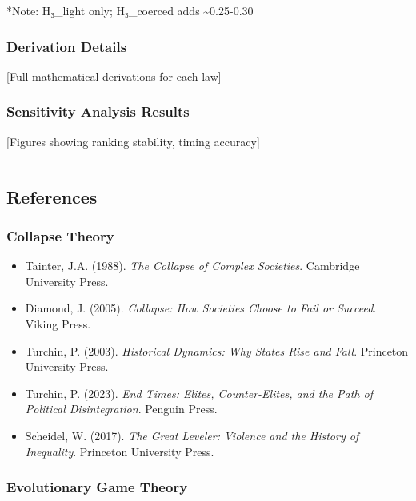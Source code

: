 \documentclass[11pt,letterpaper]{article}
\providecommand{\tightlist}{%
  \setlength{\itemsep}{0pt}\setlength{\parskip}{0pt}}
\begin{document}
*Note: H₃\_light only; H₃\_coerced adds \textasciitilde0.25-0.30

\subsubsection{Derivation Details}\label{derivation-details}

{[}Full mathematical derivations for each law{]}

\subsubsection{Sensitivity Analysis
Results}\label{sensitivity-analysis-results}

{[}Figures showing ranking stability, timing accuracy{]}

\begin{center}\rule{0.5\linewidth}{0.5pt}\end{center}

\subsection{References}\label{references}

\subsubsection{Collapse Theory}\label{collapse-theory-1}

\begin{itemize}
\tightlist
\item
  Tainter, J.A. (1988). \emph{The Collapse of Complex Societies}.
  Cambridge University Press.
\item
  Diamond, J. (2005). \emph{Collapse: How Societies Choose to Fail or
  Succeed}. Viking Press.
\item
  Turchin, P. (2003). \emph{Historical Dynamics: Why States Rise and
  Fall}. Princeton University Press.
\item
  Turchin, P. (2023). \emph{End Times: Elites, Counter-Elites, and the
  Path of Political Disintegration}. Penguin Press.
\item
  Scheidel, W. (2017). \emph{The Great Leveler: Violence and the History
  of Inequality}. Princeton University Press.
\end{itemize}

\subsubsection{Evolutionary Game
Theory}\label{evolutionary-game-theory-1}
\end{document}
